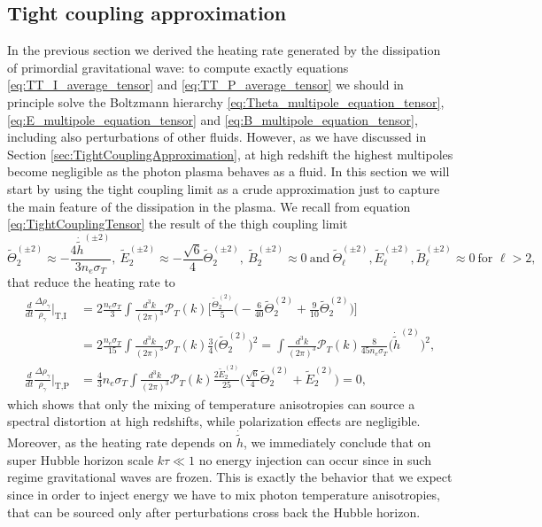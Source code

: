 \subsection{Tight coupling approximation}
In the previous section we derived the heating rate generated by the dissipation of primordial gravitational wave: to compute exactly equations \eqref{eq:TT_I_average_tensor} and \eqref{eq:TT_P_average_tensor} we should in principle solve the Boltzmann hierarchy \eqref{eq:Theta_multipole_equation_tensor}, \eqref{eq:E_multipole_equation_tensor} and \eqref{eq:B_multipole_equation_tensor}, including also perturbations of other fluids. However, as we have discussed in Section \ref{sec:TightCouplingApproximation}, at high redshift the highest multipoles become negligible as the photon plasma behaves as a fluid. In this section we will start by using the tight coupling limit as a crude approximation just to capture the main feature of the dissipation in the plasma. We recall from equation \eqref{eq:TightCouplingTensor} the result of the thigh coupling limit
$$
\tilde\Theta_2^{(\pm2)}\approx-\frac{4\dot{\tilde h}^{(\pm2)}}{3n_e\sigma_T},\ \tilde E_2^{(\pm2)}\approx-\frac{\sqrt{6}}{4}\tilde\Theta_2^{(\pm2)},\ \tilde B_{2}^{(\pm2)}\approx0\ \text{and}\ \tilde \Theta_{\ell}^{(\pm2)},\tilde E_{\ell}^{(\pm2)},\tilde B_{\ell}^{(\pm2)}\approx 0\ \text{for }\ell>2,
$$
that reduce the heating rate to
\begin{align}\nonumber
    \frac{d}{dt}\frac{\Delta\rho_\gamma}{\rho_\gamma}\bigg|_\text{T,I}&=2\frac{n_e\sigma_T}{3}\int\frac{d^3k}{(2\pi)^3}\mathcal{P}_T (k)\bigg[\frac{\tilde\Theta_2^{(2)}}{5}\bigg(-\frac{6}{40}\tilde \Theta_2^{(2)}+\frac{9}{10}\tilde\Theta_{2}^{(2)}\bigg)\bigg]\\\label{eq:HRI_tight}&=2\frac{n_e\sigma_T}{15}\int\frac{d^3k}{(2\pi)^3}\mathcal{P}_T (k)\frac{3}{4}\Big(\tilde \Theta_2^{(2)}\Big)^2=\int\frac{d^3k}{(2\pi)^3}\mathcal{P}_T (k)\frac{8}{45n_e\sigma_T}\Big(\dot{\tilde h}^{(2)}\Big)^2,\\
    \frac{d}{dt}\frac{\Delta\rho_\gamma}{\rho_\gamma}\bigg|_\text{T,P}&=\frac{4}{3}n_e\sigma_T\int\frac{d^3k}{(2\pi)^3}\mathcal{P}_T (k)\frac{2\tilde E_2^{(2)}}{25}\bigg(\frac{\sqrt{6}}{4}\tilde\Theta_2^{(2)}+\tilde E_2^{(2)}\bigg)=0,\label{eq:HRP_tight}
\end{align}
which shows that only the mixing of temperature anisotropies can source a spectral distortion at high redshifts, while polarization effects are negligible. Moreover, as the heating rate depends on $\dot{\tilde h}$, we immediately conclude that on super Hubble horizon scale $k\tau\ll1$ no energy injection can occur since in such regime gravitational waves are frozen. This is exactly the behavior that we expect since in order to inject energy we have to mix photon temperature anisotropies, that can be sourced only after perturbations cross back the Hubble horizon.
